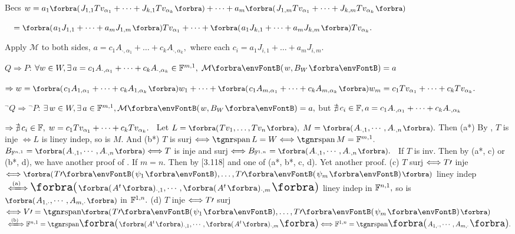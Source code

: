 Becs $w=a_1\BigPar{J_{1,1}Tv_{\alpha_1}+\dots+J_{k,1}Tv_{\alpha_k}}+\dots+a_m\BigPar{J_{1,m}Tv_{\alpha_1}+\dots+J_{k,m}Tv_{\alpha_k}}$\par\vspace{2pt}\quad\Hb
{} $\Blind{w}=\BigPar{a_1J_{1,1}+\dots+a_mJ_{1,m}}Tv_{\alpha_1}+\dots+\BigPar{a_1J_{k,1}+\dots+a_mJ_{k,m}}Tv_{\alpha_k}.$\par\vspace{2pt}\quad\Hb
{}Apply $\mathcal{M}$ to both sides, $a=c_1A_{\cdot,\alpha_1}+\dots+c_kA_{\cdot,\alpha_k},$ where each $c_i=a_1J_{i,1}+\dots+a_mJ_{i,m}.$\par\vspace{6pt}\quad\Hb
$Q\Rightarrow P:$\,\;$\forall w\in W,\exists\,a=c_1A_{\cdot,{\alpha_1}}+\dots+c_kA_{\cdot,\alpha_k}\in\Fbb^{m,1},\;\Mt{w,B_W}=a$\par\quad\Hb
{}$\Rightarrow w=\BigPar{c_1A_{1,{\alpha_1}}+\dots+c_kA_{1,{\alpha_k}}}w_1+\dots+\BigPar{c_1A_{m,{\alpha_1}}+\dots+c_kA_{m,{\alpha_k}}}w_m=c_1Tv_{\alpha_1}+\dots+c_kTv_{\alpha_k}.$\vspace{6pt}\par\quad\Hb
${}{^\neg}Q\Rightarrow{}{^\neg}P:$\,\;$\exists\,w\in W,\exists\,a\in\Fbb^{m,1},\Mt{w,B_W}=a,$ but $\nexists\,c_i\in{\mathbb{F}},a=c_1A_{\cdot,\alpha_1}+\dots+c_kA_{\cdot,\alpha_k}$\par\quad\Hb
{}$\Rightarrow\nexists\,c_i\in{\mathbb{F}},\;w=c_1Tv_{\alpha_1}+\dots+c_kTv_{\alpha_k}.$\PfEnd\vspace{6pt}
\Corollary \,\,\,Let $L=\BigPar{Tv_1,\dots,Tv_n},\;M=\BigPar{A_{\cdot,1},\cdots,A_{\cdot,n}}.$\parCor
Then (a*) By , $T$ is inje $\Longleftrightarrow L$ is liney indep, so is $M$.\parCor
And (b*) $T$ is surj $\Longleftrightarrow\Spn L=W\Longleftrightarrow\Spn M=\Fbb^{m,1}.$\parCor
\hypertarget{3C4e17}{\Corollary \,\,\,}$B_{\Fbb^{n,1}}=\BigPar{A_{\cdot,1},\cdots,A_{\cdot,n}}\Longleftrightarrow T$ is inje and surj $\Longleftrightarrow B_{\Fbb^{1,n}}=\BigPar{A_{\cdot,1},\cdots,A_{\cdot,n}}.$\parCor
\Comment \,\,\,If $T$ is inv. Then by (a*, c) or (b*, d), we have another proof of \COROLLARY.\parCor\IndentComment
\hypertarget{3F32}{\Or }If $m=n.$ Then by [3.118] and one of (a*, b*, c, d). Yet another proof.\parCor
(c) $T$ surj $\Longleftrightarrow T\prime$ inje $\Longleftrightarrow\BigPar{T\apostrophe\Par{\psi_1},\dots,T\apostrophe\Par{\psi_m}}$ liney indep\parCor\Hc
{}$\xLongleftrightarrow{\text{(a)}}{\envFontLarge\BigPar{{\envFontDefault\Par{A^t}{_{\cdot,1}},\cdots,\Par{A^t}{_{\cdot,m}}}}}$ liney indep in ${\mathbb{F}}^{n,1},$ so is $\BigPar{A_{1,\cdot},\cdots,A_{m,\cdot}}$ in ${\mathbb{F}}^{1,n}.$\vspace{6pt}\parCor
(d) $T$ inje $\Longleftrightarrow T\prime$ surj $\Longleftrightarrow V\apostrophe=\Span[\BigPar]{T\apostrophe\Par{\psi_1},\dots,T\apostrophe\Par{\psi_m}}$\parCor\Hd
{}$\xLongleftrightarrow{\text{(b)}}\Fbb^{n,1}=\Span[\envFontLarge\BigPar]{{\envFontDefault\Par{A^t}{_{\cdot,1}},\cdots,\Par{A^t}{_{\cdot,m}}}}\Longleftrightarrow\Fbb^{1,n}=\Span[\envFontLarge\BigPar]{A_{1,\cdot},\cdots,A_{m,\cdot}}.$
\SepLine

